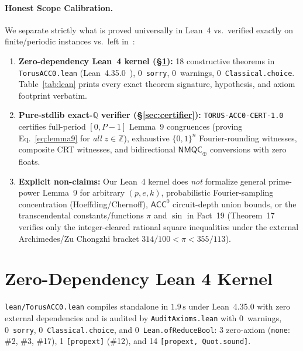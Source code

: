 \documentclass[10pt,twocolumn]{article}
\newcommand{\ZZ}{\mathbb{Z}}
\newcommand{\QQ}{\mathbb{Q}}
\begin{document}
\paragraph{Honest Scope Calibration.}
We separate strictly what is proved universally in Lean~4 vs.\ verified exactly on finite/periodic instances vs.\ left in~\cite{osaki2026torus}:
\begin{enumerate}[leftmargin=1.2em,itemsep=1pt,topsep=2pt]
  \item \textbf{Zero-dependency Lean~4 kernel (\S\ref{sec:lean}):} 18 constructive theorems in \texttt{TorusACC0.lean} (Lean~4.35.0~\cite{demoura2021lean4}), 0~\texttt{sorry}, 0~warnings, 0~\texttt{Classical.choice}. Table~\ref{tab:lean} prints every exact theorem signature, hypothesis, and axiom footprint verbatim.
  \item \textbf{Pure-stdlib exact-$\QQ$ verifier (\S\ref{sec:certifier}):} \texttt{TORUS-ACC0-CERT-1.0} certifies full-period $[0,P-1]$ Lemma~9 congruences (proving Eq.~\eqref{eq:lemma9} for \emph{all} $z\in\ZZ$), exhaustive $\{0,1\}^n$ Fourier-rounding witnesses, composite CRT witnesses, and bidirectional $\mathsf{NMQC}_\oplus$ conversions with zero floats.
  \item \textbf{Explicit non-claims:} Our Lean~4 kernel does \emph{not} formalize general prime-power Lemma~9 for arbitrary $(p,e,k)$, probabilistic Fourier-sampling concentration (Hoeffding/Chernoff), $\mathsf{ACC}^0$ circuit-depth union bounds, or the transcendental constants/functions $\pi$ and $\sin$ in Fact~19 (Theorem~17 verifies only the integer-cleared rational square inequalities under the external Archimedes/Zu Chongzhi bracket $314/100 < \pi < 355/113$).
\end{enumerate}

\section{Zero-Dependency Lean 4 Kernel}\label{sec:lean}
\texttt{lean/TorusACC0.lean} compiles standalone in $1.9\,\mathrm{s}$ under Lean~4.35.0 with zero external dependencies and is audited by \texttt{AuditAxioms.lean} with 0~warnings, 0~\texttt{sorry}, 0~\texttt{Classical.choice}, and 0~\texttt{Lean.ofReduceBool}: 3 zero-axiom (\texttt{none}: \#2, \#3, \#17), 1 \texttt{[propext]} (\#12), and 14 \texttt{[propext, Quot.sound]}.
\end{document}
